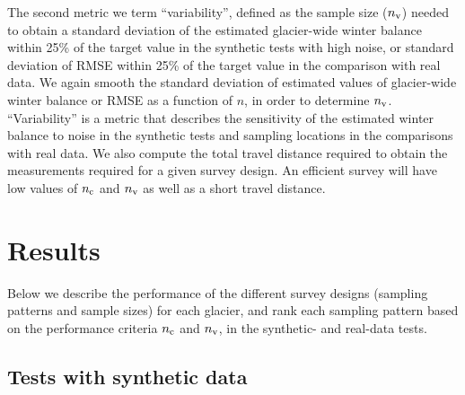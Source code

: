 \documentclass{article}
\begin{document}
The second metric we term ``variability'', defined as the sample size ($n_{\rm v}$) needed to obtain a standard deviation of the estimated glacier-wide winter balance within 25\% of the target value in the synthetic tests with high noise, or standard deviation of RMSE within 25\% of the target value in the comparison with real data. We again smooth the standard deviation of estimated values of glacier-wide winter balance or RMSE as a function of $n$, in order to determine $n_{\rm v}$. 
``Variability'' is a metric that describes the sensitivity of the estimated winter balance to noise in the synthetic tests and sampling locations in the comparisons with real data.
We also compute the total travel distance required to obtain the measurements required for a given survey design. An efficient survey will have low values of  $n_{\rm c}$ and $n_{\rm v}$ as well as a short travel distance. 

\section{Results }

Below we describe the performance of the different survey designs (sampling patterns and sample sizes) for each glacier, and rank each sampling pattern based on the performance criteria $n_{\rm c}$ and $n_{\rm v}$, in the synthetic- and real-data tests. 

\subsection{Tests with synthetic data}
\end{document}
